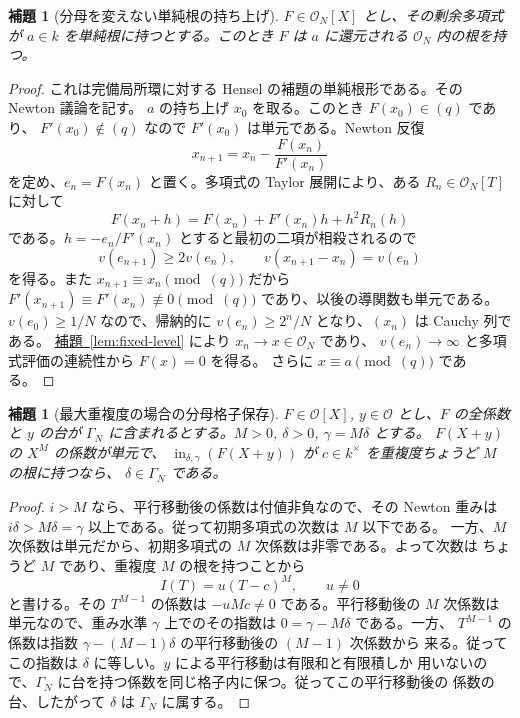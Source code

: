 \documentclass[11pt,uplatex,dvipdfmx]{jsarticle}
\newcommand{\Init}{\operatorname{in}}
\newcommand{\Ocal}{\mathcal O}
\newcommand{\namedref}[2]{\hyperref[#2]{#1~\ref*{#2}}}
\theoremstyle{proofnote}
\newtheorem{lemma}[theorem]{補題}
\begin{document}
\begin{lemma}[分母を変えない単純根の持ち上げ]
\label{lem:simple-lift}
  \(F\in\mathcal O_N[X]\) とし、その剰余多項式が \(a\in k\) を単純根に持つとする。このとき
  \(F\) は \(a\) に還元される \(\mathcal O_N\) 内の根を持つ。
\end{lemma}
\begin{proof}
  これは完備局所環に対する Hensel の補題の単純根形である。その Newton 議論を記す。
  \(a\) の持ち上げ \(x_0\) を取る。このとき \(F(x_0)\in(q)\) であり、
  \(F'(x_0)\notin(q)\) なので \(F'(x_0)\) は単元である。Newton 反復
  \[
    x_{n+1}=x_n-\frac{F(x_n)}{F'(x_n)}
  \]
  を定め、\(e_n=F(x_n)\) と置く。多項式の Taylor 展開により、ある
  \(R_n\in\mathcal O_N[T]\) に対して
  \[
    F(x_n+h)=F(x_n)+F'(x_n)h+h^2R_n(h)
  \]
  である。\(h=-e_n/F'(x_n)\) とすると最初の二項が相殺されるので
  \[
    v(e_{n+1})\ge2v(e_n),\qquad
    v(x_{n+1}-x_n)=v(e_n)
  \]
  を得る。また \(x_{n+1}\equiv x_n\pmod{(q)}\) だから
  \(F'(x_{n+1})\equiv F'(x_n)\not\equiv0\pmod{(q)}\) であり、以後の導関数も単元である。
  \(v(e_0)\ge1/N\) なので、帰納的に \(v(e_n)\ge2^n/N\) となり、\((x_n)\) は Cauchy 列である。
  \namedref{補題}{lem:fixed-level} により \(x_n\to x\in\mathcal O_N\) であり、
  \(v(e_n)\to\infty\) と多項式評価の連続性から \(F(x)=0\) を得る。
  さらに \(x\equiv a\pmod{(q)}\) である。
\end{proof}

\begin{lemma}[最大重複度の場合の分母格子保存]
\label{lem:full-multiplicity-denominator}
  \(F\in\Ocal[X]\), \(y\in\Ocal\) とし、\(F\) の全係数と \(y\) の台が
  \(\Gamma_N\) に含まれるとする。\(M>0\), \(\delta>0\), \(\gamma=M\delta\) とする。
  \(F(X+y)\) の \(X^M\) の係数が単元で、
  \(\Init_{\delta,\gamma}(F(X+y))\) が \(c\in k^\times\) を重複度ちょうど \(M\) の根に持つなら、
  \(\delta\in\Gamma_N\) である。
\end{lemma}
\begin{proof}
  \(i>M\) なら、平行移動後の係数は付値非負なので、その Newton 重みは
  \(i\delta>M\delta=\gamma\) 以上である。従って初期多項式の次数は \(M\) 以下である。
  一方、\(M\) 次係数は単元だから、初期多項式の \(M\) 次係数は非零である。よって次数は
  ちょうど \(M\) であり、重複度 \(M\) の根を持つことから
  \[
    I(T)=u(T-c)^M,\qquad u\ne0
  \]
  と書ける。その \(T^{M-1}\) の係数は \(-uMc\ne0\) である。平行移動後の \(M\) 次係数は
  単元なので、重み水準 \(\gamma\) 上でのその指数は \(0=\gamma-M\delta\) である。一方、
  \(T^{M-1}\) の係数は指数 \(\gamma-(M-1)\delta\) の平行移動後の \((M-1)\) 次係数から
  来る。従ってこの指数は \(\delta\) に等しい。\(y\) による平行移動は有限和と有限積しか
  用いないので、\(\Gamma_N\) に台を持つ係数を同じ格子内に保つ。従ってこの平行移動後の
  係数の台、したがって \(\delta\) は \(\Gamma_N\) に属する。
\end{proof}
\end{document}
